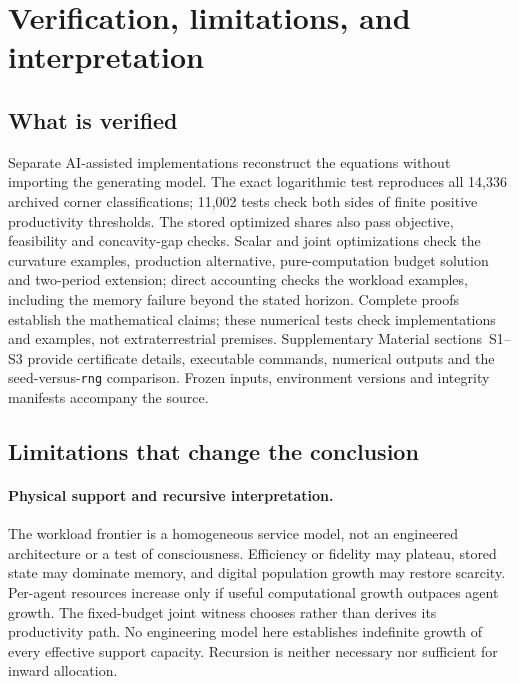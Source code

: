\section{Verification, limitations, and interpretation}
\label{sec:verification}
\subsection{What is verified}
Separate AI-assisted implementations reconstruct the equations without
importing the generating model. The exact logarithmic test reproduces
all 14,336 archived corner classifications; 11,002 tests check both sides
of finite positive productivity thresholds. The stored optimized shares
also pass objective, feasibility and concavity-gap checks. Scalar and
joint optimizations check the curvature examples, production alternative,
pure-computation budget solution and two-period extension; direct
accounting checks the workload examples, including the memory failure
beyond the stated horizon. Complete proofs establish the mathematical
claims; these numerical tests check implementations and examples, not
extraterrestrial premises. Supplementary Material sections~S1--S3 provide
certificate details, executable commands, numerical outputs and the
seed-versus-\texttt{rng} comparison. Frozen inputs, environment versions
and integrity manifests accompany the source.

\subsection{Limitations that change the conclusion}
\label{sec:limitations}
\paragraph{Physical support and recursive interpretation.}
The workload frontier is a homogeneous service model, not an engineered
architecture or a test of consciousness. Efficiency or fidelity may
plateau, stored state may dominate memory, and digital population growth
may restore scarcity. Per-agent resources increase only if useful
computational growth outpaces agent growth. The fixed-budget joint witness
chooses rather than derives its productivity path. No engineering model
here establishes indefinite growth of every effective support capacity.
Recursion is neither necessary nor sufficient for inward allocation.

